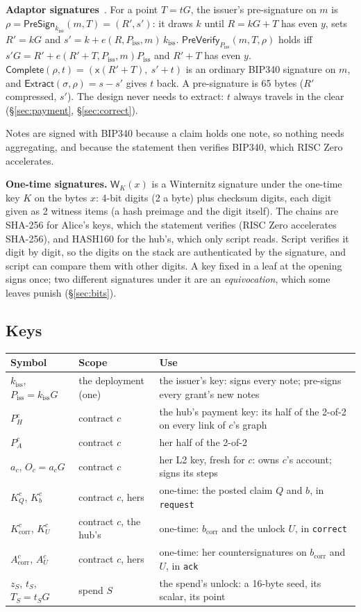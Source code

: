 \documentclass[11pt]{article}
\theoremstyle{plain}
\theoremstyle{definition}
\newcommand{\bcorr}{b_{\mathrm{corr}}}
\newcommand{\tx}[1]{\texttt{#1}}
\newcommand{\xo}[1]{\mathsf{x}(#1)}
\newcommand{\PSign}{\mathsf{PreSign}}
\newcommand{\PVfy}{\mathsf{PreVerify}}
\newcommand{\Compl}{\mathsf{Complete}}
\newcommand{\Extr}{\mathsf{Extract}}
\newcommand{\Wots}{\mathsf{W}}
\newcommand{\kiss}{k_{\mathrm{iss}}}
\newcommand{\Piss}{P_{\mathrm{iss}}}
\newcommand{\PH}{P_H^{c}}
\newcommand{\Oc}{O_c}
\newcommand{\KQ}{K_{Q}^{c}}
\newcommand{\Kb}{K_{b}^{c}}
\newcommand{\Kcorr}{K_{\mathrm{corr}}^{c}}
\newcommand{\KU}{K_{U}^{c}}
\newcommand{\Acorr}{A_{\mathrm{corr}}^{c}}
\newcommand{\AU}{A_{U}^{c}}
\begin{document}
\textbf{Adaptor signatures}~\cite{poelstra,aumayr}. For a point $T =
tG$, the issuer's pre-signature on $m$ is $\rho = \PSign_{\kiss}(m, T) =
(R', s')$: it draws $k$ until $R = kG + T$ has even $y$, sets $R' = kG$
and $s' = k + e(R, \Piss, m)\,\kiss$. $\PVfy_{\Piss}(m, T, \rho)$ holds
iff $s'G = R' + e(R' + T, \Piss, m)\Piss$ and $R' + T$ has even $y$.
$\Compl(\rho, t) = (\xo{R' + T},\ s' + t)$ is an ordinary BIP340
signature on $m$, and $\Extr(\sigma, \rho) = s - s'$ gives $t$ back. A
pre-signature is 65 bytes ($R'$ compressed, $s'$). The design never
needs to extract: $t$ always travels in the clear (\S\ref{sec:payment},
\S\ref{sec:correct}).

Notes are signed with BIP340 because a claim holds one note, so nothing
needs aggregating, and because the statement then verifies BIP340, which
RISC Zero accelerates.

\textbf{One-time signatures.} $\Wots_K(x)$ is a Winternitz signature
under the one-time key $K$ on the bytes $x$: 4-bit digits (2 a byte)
plus checksum digits, each digit given as 2 witness items (a hash
preimage and the digit itself). The chains are SHA-256 for Alice's keys,
which the statement verifies (RISC Zero accelerates SHA-256), and
HASH160 for the hub's, which only script reads. Script verifies it digit
by digit, so the digits on the stack are authenticated by the
signature, and script can compare them with other digits. A key fixed
in a leaf at the opening signs once; two different signatures under it
are an \emph{equivocation}, which some leaves punish (\S\ref{sec:bits}).

\subsection{Keys}

\begin{center}
\begin{tabularx}{\linewidth}{llL}
\toprule
Symbol & Scope & Use \\
\midrule
$\kiss$, $\Piss = \kiss G$ & the deployment (one) & the issuer's key: signs every note; pre-signs every grant's new notes \\
$\PH$ & contract $c$ & the hub's payment key: its half of the 2-of-2 on every link of $c$'s graph \\
$P_A^c$ & contract $c$ & her half of the 2-of-2 \\
$a_c$, $\Oc = a_cG$ & contract $c$ & her L2 key, fresh for $c$: owns $c$'s account; signs its steps \\
$\KQ$, $\Kb$ & contract $c$, hers & one-time: the posted claim $Q$ and $b$, in \tx{request} \\
$\Kcorr$, $\KU$ & contract $c$, the hub's & one-time: $\bcorr$ and the unlock $U$, in \tx{correct} \\
$\Acorr$, $\AU$ & contract $c$, hers & one-time: her countersignatures on $\bcorr$ and $U$, in \tx{ack} \\
$z_S$, $t_S$, $T_S = t_S G$ & spend $S$ & the spend's unlock: a 16-byte seed, its scalar, its point \\
\bottomrule
\end{tabularx}
\end{center}
\end{document}
